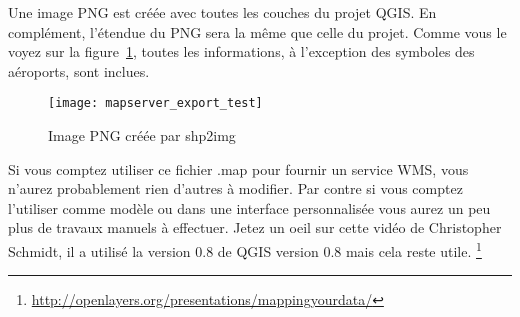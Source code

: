Une image PNG est cr\'e\'ee avec toutes les couches du projet QGIS. En compl\'ement, l'\'etendue du PNG sera la m\^eme que celle du projet. Comme vous le voyez sur la figure~\ref{fig:mapserver_export_test}, toutes les informations, \`a l'exception des symboles des a\'eroports, sont inclues.

%

\begin{figure}[ht]
\begin{center}
  \caption{Image PNG cr\'e\'ee par shp2img \nixcaption}
  \label{fig:mapserver_export_test}\smallskip
  \texttt{[image: mapserver\_export\_test]}
\end{center}
\end{figure}

Si vous comptez utiliser ce fichier .map pour fournir un service WMS, vous n'aurez probablement rien d'autres \`a modifier. Par contre si vous comptez l'utiliser comme mod\`ele ou dans une interface personnalis\'ee vous aurez un peu plus de travaux manuels \`a effectuer. Jetez un oeil sur cette vid\'eo de Christopher Schmidt, il a utilis\'e la version 0.8 de QGIS version 0.8 mais cela reste utile.
\footnote{\url{http://openlayers.org/presentations/mappingyourdata/}}
